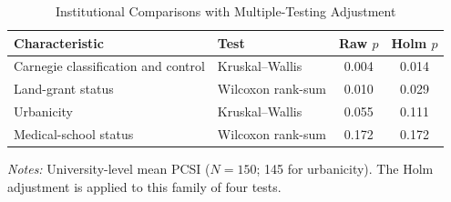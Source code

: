 \begin{table}[htbp]
\centering
\small
\caption{Institutional Comparisons with Multiple-Testing Adjustment}
\label{tab:holm}
\begin{threeparttable}
\begin{tabular}{llcc}
\toprule
Characteristic & Test & Raw $p$ & Holm $p$ \\
\midrule
Carnegie classification and control & Kruskal--Wallis & 0.004 & 0.014 \\
Land-grant status & Wilcoxon rank-sum & 0.010 & 0.029 \\
Urbanicity & Kruskal--Wallis & 0.055 & 0.111 \\
Medical-school status & Wilcoxon rank-sum & 0.172 & 0.172 \\
\bottomrule
\end{tabular}
\begin{tablenotes}[flushleft]\footnotesize
\item \textit{Notes:} University-level mean PCSI ($N=150$; 145 for urbanicity). The Holm adjustment is applied to this family of four tests.
\end{tablenotes}
\end{threeparttable}
\end{table}
